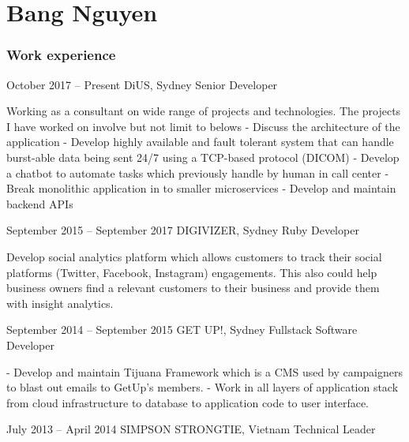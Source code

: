 \documentclass{tccv}
\begin{document}
\part{Bang Nguyen}

\section{Work experience}

\begin{eventlist}

\item{October 2017 -- Present}
    {DiUS, Sydney}
    {Senior Developer}

    Working as a consultant on wide range of projects and technologies. The projects
    I have worked on involve but not limit to belows
    \newline- Discuss the architecture of the application
    \newline- Develop highly available and fault tolerant system that can handle
    burst-able data being sent 24/7 using a TCP-based protocol (DICOM)
    \newline- Develop a chatbot to automate tasks which previously handle by
    human in call center
    \newline- Break monolithic application in to smaller microservices
    \newline- Develop and maintain backend APIs

\item{September 2015 -- September 2017}
    {DIGIVIZER, Sydney}
    {Ruby Developer}

    Develop social analytics platform which allows customers to track their
    social platforms (Twitter, Facebook, Instagram) engagements.
    This also could help business owners find a relevant customers
    to their business and provide them with insight analytics.

\item{September 2014 -- September 2015}
    {GET UP!, Sydney}
    {Fullstack Software Developer}

    - Develop and maintain Tijuana Framework which is a CMS
    used by campaigners to blast out emails to GetUp's members.
    \newline - Work in all layers of application stack from cloud infrastructure
    to database to application code to user interface.

\item{July 2013 -- April 2014}
    {SIMPSON STRONGTIE, Vietnam}
    {Technical Leader}


\end{eventlist}
\end{document}
